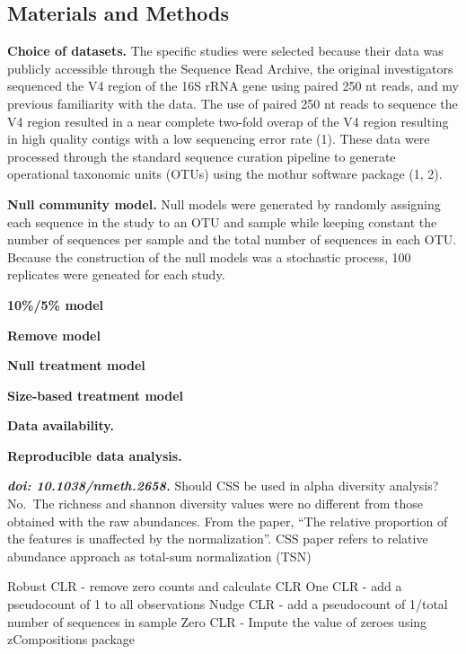 \documentclass[
]{article}
\begin{document}
\hypertarget{materials-and-methods}{%
\subsection{Materials and Methods}\label{materials-and-methods}}

\textbf{Choice of datasets.} The specific studies were selected because
their data was publicly accessible through the Sequence Read Archive,
the original investigators sequenced the V4 region of the 16S rRNA gene
using paired 250 nt reads, and my previous familiarity with the data.
The use of paired 250 nt reads to sequence the V4 region resulted in a
near complete two-fold overap of the V4 region resulting in high quality
contigs with a low sequencing error rate (1). These data were processed
through the standard sequence curation pipeline to generate operational
taxonomic units (OTUs) using the mothur software package (1, 2).

\textbf{Null community model.} Null models were generated by randomly
assigning each sequence in the study to an OTU and sample while keeping
constant the number of sequences per sample and the total number of
sequences in each OTU. Because the construction of the null models was a
stochastic process, 100 replicates were geneated for each study.

\textbf{10\%/5\% model}

\textbf{Remove model}

\textbf{Null treatment model}

\textbf{Size-based treatment model}

\textbf{Data availability.}

\textbf{Reproducible data analysis.}

\textbf{\emph{doi: 10.1038/nmeth.2658.}} Should CSS be used in alpha
diversity analysis? No.~The richness and shannon diversity values were
no different from those obtained with the raw abundances. From the
paper, ``The relative proportion of the features is unaffected by the
normalization''. CSS paper refers to relative abundance approach as
total-sum normalization (TSN)

Robust CLR - remove zero counts and calculate CLR One CLR - add a
pseudocount of 1 to all observations Nudge CLR - add a pseudocount of
1/total number of sequences in sample Zero CLR - Impute the value of
zeroes using zCompositions package
\end{document}
